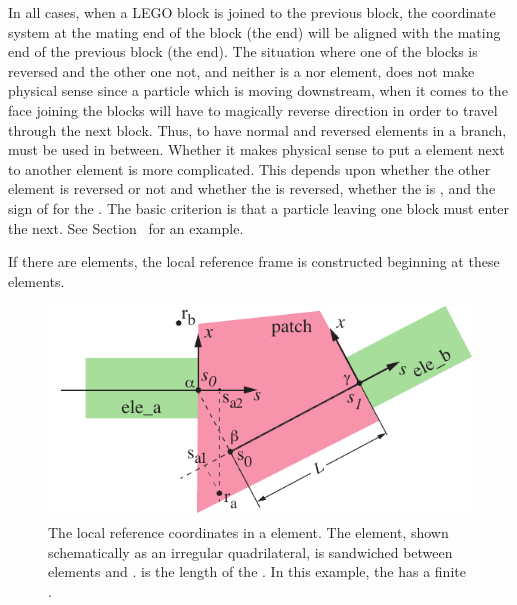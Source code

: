 In all cases, when a LEGO block is joined to the previous block, the coordinate system at the mating
end of the block (the  end) will be aligned with the mating end of the previous block
(the  end). The situation where one of the blocks is reversed and the other one not,
and neither is a  nor  element, does not make physical sense since a
particle which is moving downstream, when it comes to the face joining the blocks will have to
magically reverse direction in order to travel through the next block. Thus, to have normal and
reversed elements in a branch,   must be used in between.  Whether it
makes physical sense to put a  element next to another element is more complicated. This
depends upon whether the other element is reversed or not and whether the  is reversed,
whether the  is , and the sign of  for the . The
basic criterion is that a particle leaving one block must enter the next. See
Section~ for an example.

If there are  elements, the local reference frame is constructed beginning at these
elements.


\begin{figure}[tb]
  \centering
  \includegraphics[width=5in]{patch-problem.pdf}
  \caption[The local reference coordinates in a  element.]
{The local reference coordinates in a  element. The  element, shown
schematically as an irregular quadrilateral, is sandwiched between elements  and
.  is the length of the . In this example, the  has a finite
.}
  \label{f:patch.prob}
\end{figure}

